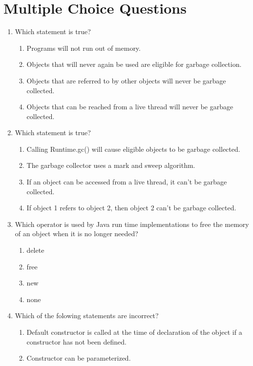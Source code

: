 \documentclass[11pt,a4paper]{article}
\begin{document}
  \section*{Multiple Choice Questions}
  \begin{enumerate}
    \item Which statement is true?
        \begin{enumerate}
            \item Programs will not run out of memory.
            \item Objects that will never again be used are eligible for garbage collection.
            \item Objects that are referred to by other objects will never be garbage collected.
            \item Objects that can be reached from a live thread will never be garbage collected.
        \end{enumerate}
    \item Which statement is true?
        \begin{enumerate}
            \item Calling Runtime.gc() will cause eligible objects to be garbage collected.
            \item The garbage collector uses a mark and sweep algorithm.
            \item If an object can be accessed from a live thread, it can't be garbage collected.
            \item If object 1 refers to object 2, then object 2 can't be garbage collected.
        \end{enumerate}
    \item Which operator is used by Java run time implementations to free the memory of an object when it is no longer needed?
        \begin{enumerate}
        \item delete
        \item free
        \item new
        \item none
    \end{enumerate}
\item Which of the folowing statements are incorrect?
    \begin{enumerate}
        \item Default constructor is called at the time of declaration of the object if a constructor has not been defined.
        \item Constructor can be parameterized.

\end{enumerate}
\end{enumerate}
\end{document}
